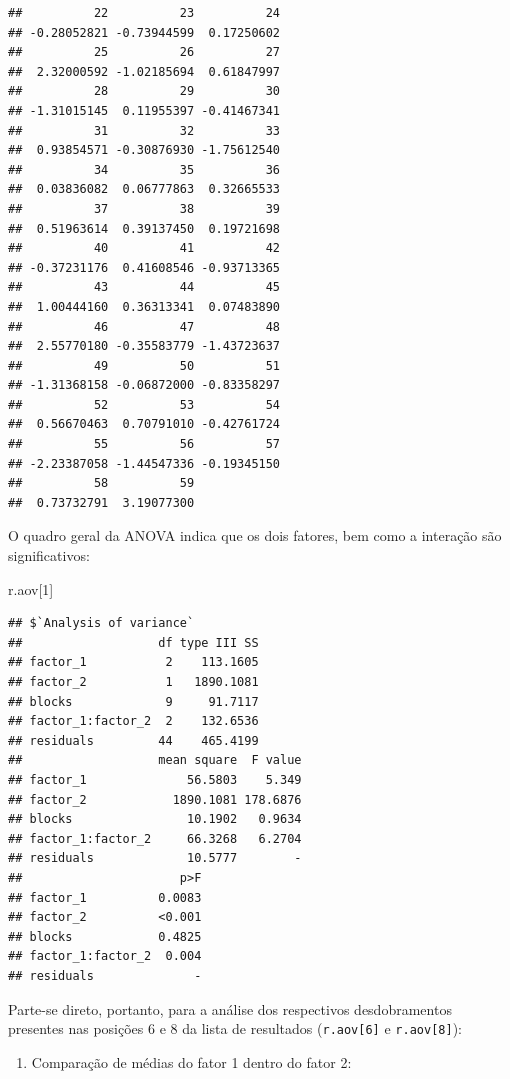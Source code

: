 \documentclass[
]{article}
\newenvironment{Shaded}{\begin{snugshade}}{\end{snugshade}}
\newcommand{\DecValTok}[1]{\textcolor[rgb]{0.00,0.00,0.81}{#1}}
\newcommand{\NormalTok}[1]{#1}
\providecommand{\tightlist}{%
  \setlength{\itemsep}{0pt}\setlength{\parskip}{0pt}}
\begin{document}
\begin{verbatim}
##          22          23          24 
## -0.28052821 -0.73944599  0.17250602 
##          25          26          27 
##  2.32000592 -1.02185694  0.61847997 
##          28          29          30 
## -1.31015145  0.11955397 -0.41467341 
##          31          32          33 
##  0.93854571 -0.30876930 -1.75612540 
##          34          35          36 
##  0.03836082  0.06777863  0.32665533 
##          37          38          39 
##  0.51963614  0.39137450  0.19721698 
##          40          41          42 
## -0.37231176  0.41608546 -0.93713365 
##          43          44          45 
##  1.00444160  0.36313341  0.07483890 
##          46          47          48 
##  2.55770180 -0.35583779 -1.43723637 
##          49          50          51 
## -1.31368158 -0.06872000 -0.83358297 
##          52          53          54 
##  0.56670463  0.70791010 -0.42761724 
##          55          56          57 
## -2.23387058 -1.44547336 -0.19345150 
##          58          59 
##  0.73732791  3.19077300
\end{verbatim}

O quadro geral da ANOVA indica que os dois fatores, bem como a interação são significativos:

\begin{Shaded}
\begin{Highlighting}[]
\NormalTok{r.aov[}\DecValTok{1}\NormalTok{]}
\end{Highlighting}
\end{Shaded}

\begin{verbatim}
## $`Analysis of variance`
##                   df type III SS
## factor_1           2    113.1605
## factor_2           1   1890.1081
## blocks             9     91.7117
## factor_1:factor_2  2    132.6536
## residuals         44    465.4199
##                   mean square  F value
## factor_1              56.5803    5.349
## factor_2            1890.1081 178.6876
## blocks                10.1902   0.9634
## factor_1:factor_2     66.3268   6.2704
## residuals             10.5777        -
##                      p>F
## factor_1          0.0083
## factor_2          <0.001
## blocks            0.4825
## factor_1:factor_2  0.004
## residuals              -
\end{verbatim}

Parte-se direto, portanto, para a análise dos respectivos desdobramentos presentes nas posições 6 e 8 da lista de resultados (\texttt{r.aov{[}6{]}} e \texttt{r.aov{[}8{]}}):

\begin{enumerate}
\def\labelenumi{\arabic{enumi}.}
\tightlist
\item
  Comparação de médias do fator 1 dentro do fator 2:
\end{enumerate}
\end{document}
